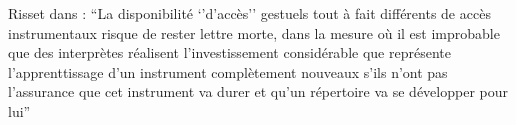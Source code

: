 Risset dans \cite{genevois_les_1999} : ``La disponibilité `'d'accès'' gestuels tout à fait différents de accès instrumentaux risque de rester lettre morte, dans la mesure où il est improbable que des interprètes réalisent l'investissement considérable que représente l'apprenttissage d'un instrument complètement nouveaux s'ils n'ont pas l'assurance que cet instrument va durer et qu'un répertoire va se développer pour lui''

